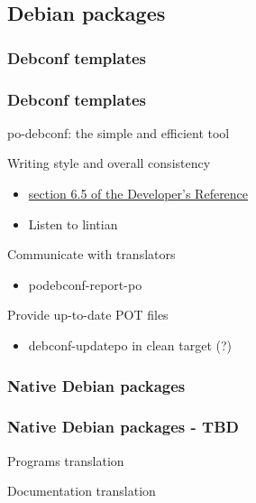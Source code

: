 \documentclass{beamer}
\begin{document}

\subsection{Debian packages}

\subsubsection{Debconf templates}

\begin{frame}
  \frametitle{Debconf templates}
	\begin{block}
		{po-debconf: the simple and efficient tool}
	\end{block}
	\begin{block}
		{Writing style and overall consistency}
		\begin{itemize}
		\item
			\href{http://www.debian.org/doc/developers-reference/ch-best-pkging-practices.html\#s-bpp-config-mgmt}{section 6.5 of the Developer's Reference}
		\item
			Listen to lintian
		\end{itemize}
	\end{block}
	\begin{block}
		{Communicate with translators}
		\begin{itemize}
		\item
			podebconf-report-po
		\end{itemize}
	\end{block}
	\begin{block}
		{Provide up-to-date POT files}
		\begin{itemize}
		\item
			debconf-updatepo in clean target (?)
		\end{itemize}
	\end{block}
\end{frame}

\subsubsection{Native Debian packages}

\begin{frame}
  \frametitle{Native Debian packages - TBD}
	\begin{block}
		{Programs translation}
	\end{block}
	\begin{block}
		{Documentation translation}
	\end{block}
\end{frame}
\end{document}
